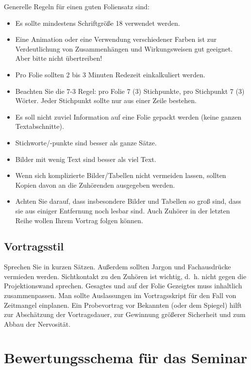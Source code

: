 \documentclass[final,bibliography=totocnumbered]{include/sikseminar}
\begin{document}
Generelle Regeln für einen guten Foliensatz sind:
\begin{itemize}
	\item Es sollte mindestens Schriftgröße 18 verwendet werden.
	\item Eine Animation oder eine Verwendung verschiedener Farben ist zur Verdeutlichung von Zusammenhängen und Wirkungsweisen gut geeignet. Aber bitte nicht übertreiben!
	\item Pro Folie sollten 2 bis 3 Minuten Redezeit einkalkuliert werden.
	\item Beachten Sie die 7-3 Regel: pro Folie 7 (\textpm{}3) Stichpunkte, pro Stichpunkt 7 (\textpm{}3) Wörter. Jeder Stichpunkt sollte nur aus einer Zeile bestehen.
	\item Es soll nicht zuviel Information auf eine Folie gepackt werden (keine ganzen Textabschnitte).
	\item Stichworte/-punkte sind besser als ganze Sätze.
	\item Bilder mit wenig Text sind besser als viel Text.
	\item Wenn sich komplizierte Bilder/Tabellen nicht vermeiden lassen, sollten Kopien davon an die Zuhörenden ausgegeben werden.
	\item Achten Sie darauf, dass insbesondere Bilder und Tabellen so groß sind, dass sie aus einiger Entfernung noch lesbar sind. Auch Zuhörer in der letzten Reihe wollen Ihrem Vortrag folgen können.
\end{itemize}

\subsection{Vortragsstil}
Sprechen Sie in kurzen Sätzen. Außerdem sollten Jargon und Fachausdrücke vermieden werden.
Sichtkontakt zu den Zuhören ist wichtig, d.~h. nicht gegen die Projektionswand sprechen.
Gesagtes und auf der Folie Gezeigtes muss inhaltlich zusammenpassen.
Man sollte Auslassungen im Vortragsskript für den Fall von Zeitmangel einplanen.
Ein Probevortrag vor Bekannten (oder dem Spiegel) hilft zur Abschätzung der Vortragsdauer, zur Gewinnung größerer Sicherheit und zum Abbau der Nervosität.




\section{Bewertungsschema für das Seminar}
\end{document}
